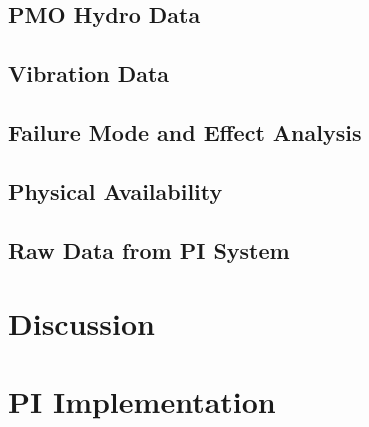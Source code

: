 \documentclass[11pt,a4paper,twoside,onecolumn]{book}
\begin{document}
		\section{PMO Hydro Data}
		
		\section{Vibration Data}
		
		\section{Failure Mode and Effect Analysis}
		
		\section{Physical Availability}
		
		\section{Raw Data from PI System}
		
	\chapter{Discussion}
	
	\chapter{PI Implementation}
	
\end{document}
